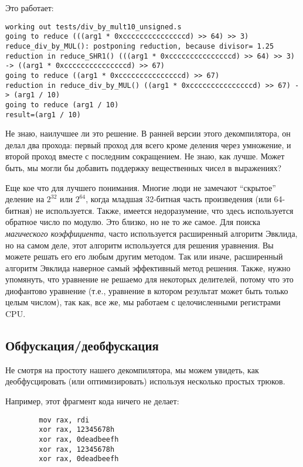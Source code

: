 Это работает:

\begin{lstlisting}
working out tests/div_by_mult10_unsigned.s
going to reduce (((arg1 * 0xcccccccccccccccd) >> 64) >> 3)
reduce_div_by_MUL(): postponing reduction, because divisor= 1.25
reduction in reduce_SHR1() (((arg1 * 0xcccccccccccccccd) >> 64) >> 3) -> ((arg1 * 0xcccccccccccccccd) >> 67)
going to reduce ((arg1 * 0xcccccccccccccccd) >> 67)
reduction in reduce_div_by_MUL() ((arg1 * 0xcccccccccccccccd) >> 67) -> (arg1 / 10)
going to reduce (arg1 / 10)
result=(arg1 / 10)
\end{lstlisting}

Не знаю, наилучшее ли это решение. В ранней версии этого декомпилятора, он делал два прохода:
первый проход для всего кроме деления через умножение, и второй проход вместе с последним сокращением.
Не знаю, как лучше.
Может быть, мы могли бы добавить поддержку вещественных чисел в выражениях?

Еще кое что для лучшего понимания.
Многие люди не замечают ``скрытое'' деление на $2^{32}$ или $2^{64}$,
когда младшая 32-битная часть произведения (или 64-битная) не используется.
Также, имеется недоразумение, что здесь используется обратное число по модулю.
Это близко, но не то же самое.
Для поиска \textit{магического коэффициента}, часто используется расширенный алгоритм Эвклида, но на самом деле,
этот алгоритм используется для решения уравнения.
Вы можете решать его его любым другим методом.
Так или иначе, расширенный алгоритм Эвклида наверное самый эффективный метод решения.
Также, нужно упомянуть, что уравнение не решаемо для некоторых делителей, потому что это диофантово уравнение
(т.е., уравнение в котором результат может быть только целым числом), так как, все же, мы работаем с целочисленными
регистрами CPU.

\subsection{Обфускация/деобфускация}

Не смотря на простоту нашего декомпилятора, мы можем увидеть, как деобфусцировать (или оптимизировать) используя
несколько простых трюков.

Например, этот фрагмент кода ничего не делает:

\begin{lstlisting}
        mov rax, rdi
        xor rax, 12345678h
        xor rax, 0deadbeefh
        xor rax, 12345678h
        xor rax, 0deadbeefh
\end{lstlisting}


